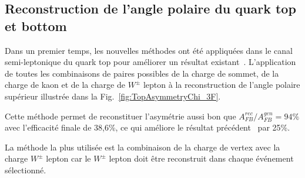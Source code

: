 \newpage
\subsection*{Reconstruction de l'angle polaire du quark top et bottom}
Dans un premier temps, les nouvelles méthodes ont été appliquées dans le canal semi-leptonique du  quark top pour améliorer un résultat existant~\cite{bib:ILCTOP}.
L'application de toutes les combinaisons de paires possibles de la charge de sommet, de la charge de kaon et de la charge de $W^\pm$ lepton à la reconstruction de l'angle polaire supérieur illustrée dans la Fig.~\ref {fig:TopAsymmetryChi_3F}.

Cette méthode permet de reconstituer l'asymétrie aussi bon que $A_ {FB}^{rec} / A^{gen}_{FB} = 94\%$ avec l'efficacité finale de 38,6\%, ce qui améliore le résultat précédent~\cite{bib:ILCTOP} par 25\%.

La méthode la plus utilisée est la combinaison de la charge de vertex avec la charge $W^\pm$ lepton car le $ W^\pm$ lepton doit être reconstruit dans chaque événement sélectionné.


